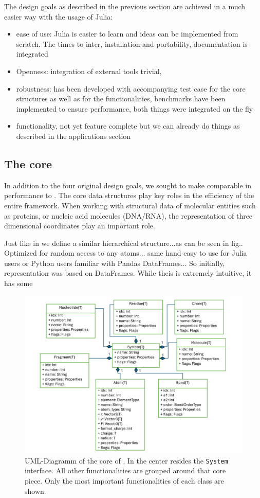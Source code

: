 The design goals as described in the previous section are achieved in a much easier way with the usage of Julia:
\begin{itemize}
	\item ease of use: Julia is easier to learn and ideas can be implemented from scratch. The times to inter, installation and portability, documentation is integrated
	\item Openness: integration of external tools trivial, 
	\item robustness: \biochem has been developed with accompanying test case for the core structures as well as for the functionalities, benchmarks have been implemented to ensure performance, both things were integrated on the fly
	\item functionality, not yet feature complete but we can already do things as described in the applications section
\end{itemize}


\subsection{The core}
In addition to the four original design goals, we sought to make \biochem comparable in performance to \ball. The core data structures play key roles in the efficiency of the entire framework. When working with structural data of molecular entities such as proteins, or nucleic acid molecules (DNA/RNA), the representation of three dimensional coordinates play an important role. 

Just like in \ball we define a similar hierarchical structure...as can be seen in fig..
Optimized for random access to any atoms...
same hand easy to use for Julia users or Python users familiar with Pandas DataFrames...
So initially, representation was based on DataFrames. While theis is extremely intuitive, it has some 


\begin{figure}[t]
	\centerline{\includegraphics[width=15cm]{gfx/uml.png}}
	\caption{UML-Diagramm of the core of \biochem . In the center resides the \texttt{System} interface. All other functionalities are grouped around that core piece. Only the most important functionalities of each class are  shown.}
	\label{fig:biochem_uml}
\end{figure}

